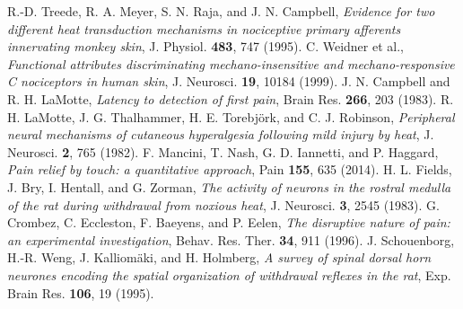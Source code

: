  R.-D. Treede, R. A. Meyer, S. N. Raja, and J. N. Campbell, \emph{Evidence for two different heat transduction mechanisms in nociceptive primary afferents innervating monkey skin}, J. Physiol. \textbf{483}, 747 (1995).
 C. Weidner et al., \emph{Functional attributes discriminating mechano-insensitive and mechano-responsive C nociceptors in human skin}, J. Neurosci. \textbf{19}, 10184 (1999).
 J. N. Campbell and R. H. LaMotte, \emph{Latency to detection of first pain}, Brain Res. \textbf{266}, 203 (1983).
 R. H. LaMotte, J. G. Thalhammer, H. E. Torebj{\"o}rk, and C. J. Robinson, \emph{Peripheral neural mechanisms of cutaneous hyperalgesia following mild injury by heat}, J. Neurosci. \textbf{2}, 765 (1982).
 F. Mancini, T. Nash, G. D. Iannetti, and P. Haggard, \emph{Pain relief by touch: a quantitative approach}, Pain \textbf{155}, 635 (2014).
 H. L. Fields, J. Bry, I. Hentall, and G. Zorman, \emph{The activity of neurons in the rostral medulla of the rat during withdrawal from noxious heat}, J. Neurosci. \textbf{3}, 2545 (1983).
 G. Crombez, C. Eccleston, F. Baeyens, and P. Eelen, \emph{The disruptive nature of pain: an experimental investigation}, Behav. Res. Ther. \textbf{34}, 911 (1996).
 J. Schouenborg, H.-R. Weng, J. Kalliom{\"a}ki, and H. Holmberg, \emph{A survey of spinal dorsal horn neurones encoding the spatial organization of withdrawal reflexes in the rat}, Exp. Brain Res. \textbf{106}, 19 (1995).
